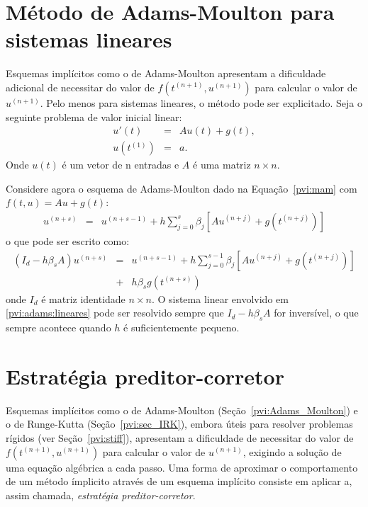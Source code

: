% 
% 
% 

\section{Método de Adams-Moulton para sistemas lineares}
Esquemas implícitos como o de Adams-Moulton apresentam a dificuldade adicional de necessitar do valor de $f(t^{(n+1)},u^{(n+1)})$ para calcular o valor de $u^{(n+1)}$. Pelo menos para sistemas lineares, o método pode ser explicitado. Seja o seguinte problema de valor inicial linear:
\begin{eqnarray*}
 u'(t)&=& Au(t) + g(t),\\
 u(t^{(1)}) &=& a.
\end{eqnarray*}
Onde $u(t)$ é um vetor de n entradas e $A$ é uma matriz $n\times n$.

Considere agora o esquema de Adams-Moulton dado na Equação~\eqref{pvi:mam} com $f(t,u)=Au+g(t)$:
\begin{eqnarray*}
  u^{(n+s)}  &=& u^{(n+s-1)}  + h\sum_{j=0}^{s}\beta_j \left[Au^{(n+j)} + g(t^{(n+j)})\right]
\end{eqnarray*}
o que pode ser escrito como:
\begin{eqnarray}\label{pvi:adams:lineares}
  \left(I_d-h\beta_s A\right)u^{(n+s)}  &=& u^{(n+s-1)}  + h\sum_{j=0}^{s-1}\beta_j \left[Au^{(n+j)}+ g(t^{(n+j)})\right]\nonumber\\
  &+& h\beta_s g(t^{(n+s)}) 
\end{eqnarray}
onde $I_d$ é matriz identidade $n\times n$. O sistema linear envolvido em \ref{pvi:adams:lineares} pode ser resolvido sempre que $I_d-h\beta_s A$ for inversível, o que sempre acontece quando $h$ é suficientemente pequeno.



\section{Estratégia preditor-corretor}
Esquemas implícitos como o de Adams-Moulton (Seção~\ref{pvi:Adams_Moulton}) e o de Runge-Kutta (Seção~\ref{pvi:sec_IRK}), embora úteis para resolver problemas rígidos (ver Seção~\ref{pvi:stiff}), apresentam a dificuldade de necessitar do valor de $f(t^{(n+1)},u^{(n+1)})$ para calcular o valor de $u^{(n+1)}$, exigindo a solução de uma equação algébrica a cada passo. Uma forma de aproximar o comportamento de um método ímplicito através de um esquema implícito consiste em aplicar a, assim chamada, \emph{estratégia preditor-corretor}.

